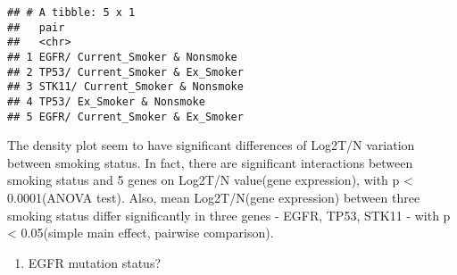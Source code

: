 \documentclass[
]{article}
\providecommand{\tightlist}{%
  \setlength{\itemsep}{0pt}\setlength{\parskip}{0pt}}
\begin{document}
\begin{verbatim}
## # A tibble: 5 x 1
##   pair                            
##   <chr>                           
## 1 EGFR/ Current_Smoker & Nonsmoke 
## 2 TP53/ Current_Smoker & Ex_Smoker
## 3 STK11/ Current_Smoker & Nonsmoke
## 4 TP53/ Ex_Smoker & Nonsmoke      
## 5 EGFR/ Current_Smoker & Ex_Smoker
\end{verbatim}

The density plot seem to have significant differences of Log2T/N
variation between smoking status. In fact, there are significant
interactions between smoking status and 5 genes on Log2T/N value(gene
expression), with p \textless{} 0.0001(ANOVA test). Also, mean
Log2T/N(gene expression) between three smoking status differ
significantly in three genes - EGFR, TP53, STK11 - with p \textless{}
0.05(simple main effect, pairwise comparison).

\begin{enumerate}
\def\labelenumi{\arabic{enumi})}
\setcounter{enumi}{2}
\tightlist
\item
  EGFR mutation status?
\end{enumerate}
\end{document}

